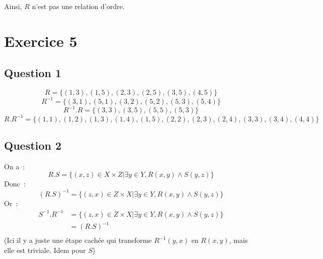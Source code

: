 \documentclass[a4paper]{article}
\begin{document}
    Ainsi, $R$ n'est pas une relation d'ordre.
    \section*{Exercice 5}
    \subsection*{Question 1}
    $$ R = \{
        (1, 3), (1, 5),
        (2, 3), (2, 5),
        (3, 5),
        (4, 5)
    \} $$
    $$ R^{-1} = \{
        (3, 1), (5, 1),
        (3, 2), (5, 2),
        (5, 3),
        (5, 4)
    \}$$
    $$ R^{-1}.R = \{(3,3), (3, 5), (5,5), (5,3)\} $$
    $$ R.R^{-1} = \{(1,1), (1,2), (1,3), (1,4), (1,5), (2,2), (2,3), (2,4), (3,3), (3,4), (4,4)\} $$
    \subsection*{Question 2}
    On a~:
    $$ R.S = \{(x,z)\in X\times Z | \exists y\in Y, R(x,y)\land S(y,z)\} $$
    Donc~:
    $$ (R.S)^{-1} = \{(z,x)\in Z\times X | \exists y\in Y, R(x,y)\land S(y,z)\} $$
    Or~:
    \begin{align*}
        S^{-1}.R^{-1} &= \{(z,x)\in Z\times X | \exists y\in Y, R(x,y)\land S(y,z)\} \\
        &= (R.S)^{-1} \\
    \end{align*}
    (Ici il y a juste une étape cachée qui transforme $R^{-1}(y,x)$ en $R(x,y)$, mais elle est triviale. Idem pour $S$)
\end{document}
